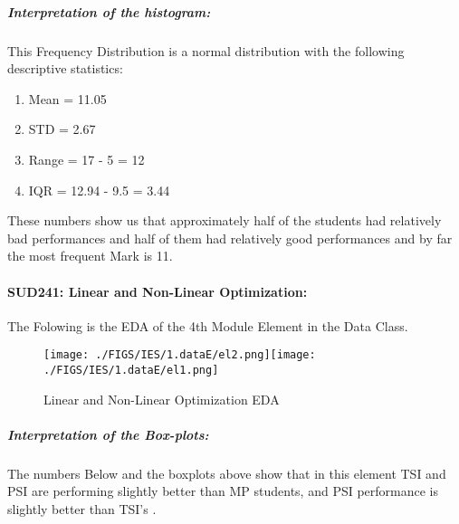 \documentclass[12pt]{extreport}
\begin{document}
\subparagraph{Interpretation of the histogram:\\
}
This Frequency Distribution is a normal distribution with the following descriptive statistics:
\begin{enumerate}
	\item Mean = 11.05
	\item STD = 2.67
	\item Range = 17 - 5 = 12
	\item IQR = 12.94 - 9.5 = 3.44
\end{enumerate}
These numbers show us that approximately half of the students had relatively bad performances and half of them had relatively good performances and by far the most frequent Mark is 11.


\paragraph{\large SUD241: Linear and Non-Linear Optimization:\\
} 
The Folowing is the EDA of the 4th Module Element in the Data Class.


\begin{figure}[H]
	\centering
	\texttt{[image: ./FIGS/IES/1.dataE/el2.png]}\texttt{[image: ./FIGS/IES/1.dataE/el1.png]}
	\caption{Linear and Non-Linear Optimization EDA}
	\label{fig:9}
\end{figure}


\subparagraph{Interpretation of the Box-plots:\\
}
The numbers Below and the boxplots above show that in this element TSI and PSI are performing slightly better than MP students, and PSI performance is slightly better than TSI's .
\end{document}
